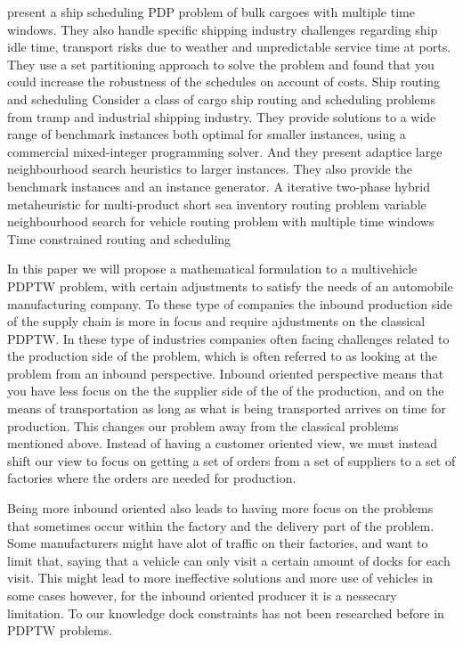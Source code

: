 \documentclass[../main.tex]{subfiles}
\begin{document}
\cite{christiansen02} present a ship scheduling PDP problem of bulk cargoes with multiple time windows. 
They also handle specific shipping industry challenges regarding ship idle time, transport risks due to weather and unpredictable service time at ports. 
They use a set partitioning approach to solve the problem and found that you could increase the robustness of the schedules on account of costs.
\cite{christiansen04} Ship routing and scheduling 
\cite{hemmati14} Consider a class of cargo ship routing and scheduling problems from tramp and industrial shipping industry. 
They provide solutions to a wide range of benchmark instances both optimal for smaller instances, using a commercial mixed-integer programming solver.
And they present adaptice large neighbourhood search heuristics to larger instances.
They also provide the benchmark instances and an instance generator.
\cite{hemmati16} A iterative two-phase hybrid metaheuristic for multi-product short sea inventory routing problem
\cite{ferreira18} variable neighbourhood search for vehicle routing problem with multiple time windows
\cite{desrosiers95} Time constrained routing and scheduling


In this paper we will propose a mathematical formulation to a multivehicle PDPTW problem, with certain adjustments to satisfy the needs of an automobile manufacturing company.
To these type of companies the inbound production side of the supply chain is more in focus and require ajdustments on the classical PDPTW.
In these type of industries companies often facing challenges related to the production side of the problem, which is often referred to as looking at the problem from an inbound perspective.
Inbound oriented perspective means that you have less focus on the the supplier side of the of the production, and on the means of transportation as long as what is being transported arrives on time for production.
This changes our problem away from the classical problems mentioned above. 
Instead of having a customer oriented view, we must instead shift our view to focus on getting a set of orders from a set of suppliers to a set of factories where the orders are needed for production. 
\par
Being more inbound oriented also leads to having more focus on the problems that sometimes occur within the factory and the delivery part of the problem.
Some manufacturers might have alot of traffic on their factories, and want to limit that, saying that a vehicle can only visit a certain amount of docks for each visit.
This might lead to more ineffective solutions and more use of vehicles in some cases however, for the inbound oriented producer it is a nessecary limitation. To our knowledge dock constraints has not been researched before in PDPTW problems. \par
\end{document}
